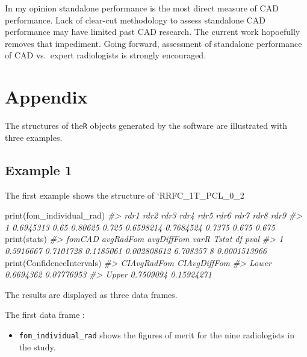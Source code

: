 \documentclass[
]{book}
\newenvironment{Shaded}{\begin{snugshade}}{\end{snugshade}}
\newcommand{\CommentTok}[1]{\textcolor[rgb]{0.56,0.35,0.01}{\textit{#1}}}
\newcommand{\FunctionTok}[1]{\textcolor[rgb]{0.00,0.00,0.00}{#1}}
\newcommand{\NormalTok}[1]{#1}
\providecommand{\tightlist}{%
  \setlength{\itemsep}{0pt}\setlength{\parskip}{0pt}}
\begin{document}
In my opinion standalone performance is the most direct measure of CAD performance. Lack of clear-cut methodology to assess standalone CAD performance may have limited past CAD research. The current work hopoefully removes that impediment. Going forward, assessment of standalone performance of CAD vs.~expert radiologists is strongly encouraged.

\hypertarget{standalone-cad-radiologists-appendix}{%
\section{Appendix}\label{standalone-cad-radiologists-appendix}}

The structures of the\texttt{R} objects generated by the software are illustrated with three examples.

\hypertarget{example-1-1}{%
\subsection{Example 1}\label{example-1-1}}

The first example shows the structure of `RRFC\_1T\_PCL\_0\_2

\begin{Shaded}
\begin{Highlighting}[]
\FunctionTok{print}\NormalTok{(fom\_individual\_rad)}
\CommentTok{\#\textgreater{}        rdr1 rdr2    rdr3  rdr4      rdr5      rdr6   rdr7  rdr8  rdr9}
\CommentTok{\#\textgreater{} 1 0.6945313 0.65 0.80625 0.725 0.6598214 0.7684524 0.7375 0.675 0.675}
\FunctionTok{print}\NormalTok{(stats)}
\CommentTok{\#\textgreater{}      fomCAD avgRadFom avgDiffFom        varR    Tstat df         pval}
\CommentTok{\#\textgreater{} 1 0.5916667 0.7101728  0.1185061 0.002808612 6.708357  8 0.0001513966}
\FunctionTok{print}\NormalTok{(ConfidenceIntervals)}
\CommentTok{\#\textgreater{}       CIAvgRadFom CIAvgDiffFom}
\CommentTok{\#\textgreater{} Lower   0.6694362   0.07776953}
\CommentTok{\#\textgreater{} Upper   0.7509094   0.15924271}
\end{Highlighting}
\end{Shaded}

The results are displayed as three data frames.

The first data frame :

\begin{itemize}
\tightlist
\item
  \texttt{fom\_individual\_rad} shows the figures of merit for the nine radiologists in the study.
\end{itemize}
\end{document}
